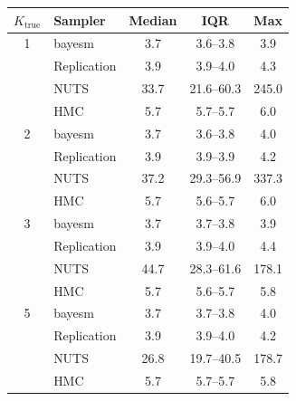 \begin{tabular}{clccc}
\toprule
$K_{\text{true}}$ & Sampler & Median & IQR & Max \\
\midrule
1 & bayesm & 3.7 & 3.6--3.8 & 3.9 \\
 & Replication & 3.9 & 3.9--4.0 & 4.3 \\
 & NUTS & 33.7 & 21.6--60.3 & 245.0 \\
 & HMC & 5.7 & 5.7--5.7 & 6.0 \\
2 & bayesm & 3.7 & 3.6--3.8 & 4.0 \\
 & Replication & 3.9 & 3.9--3.9 & 4.2 \\
 & NUTS & 37.2 & 29.3--56.9 & 337.3 \\
 & HMC & 5.7 & 5.6--5.7 & 6.0 \\
3 & bayesm & 3.7 & 3.7--3.8 & 3.9 \\
 & Replication & 3.9 & 3.9--4.0 & 4.4 \\
 & NUTS & 44.7 & 28.3--61.6 & 178.1 \\
 & HMC & 5.7 & 5.6--5.7 & 5.8 \\
5 & bayesm & 3.7 & 3.7--3.8 & 4.0 \\
 & Replication & 3.9 & 3.9--4.0 & 4.2 \\
 & NUTS & 26.8 & 19.7--40.5 & 178.7 \\
 & HMC & 5.7 & 5.7--5.7 & 5.8 \\
\bottomrule
\end{tabular}
